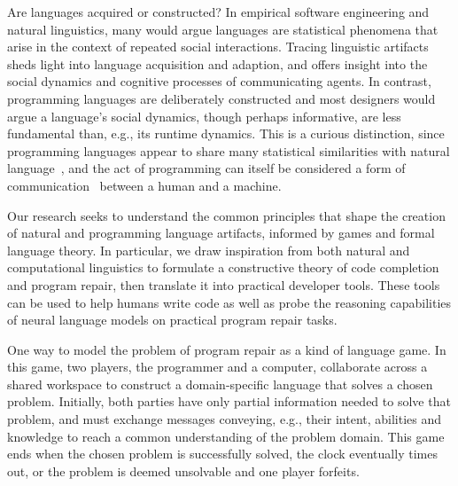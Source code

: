 \documentclass[sigplan,screen]{acmart}
\begin{document}

Are languages acquired or constructed? In empirical software engineering and natural linguistics, many would argue languages are statistical phenomena that arise in the context of repeated social interactions. Tracing linguistic artifacts sheds light into language acquisition and adaption, and offers insight into the social dynamics and cognitive processes of communicating agents. In contrast, programming languages are deliberately constructed and most designers would argue a language's social dynamics, though perhaps informative, are less fundamental than, e.g., its runtime dynamics. This is a curious distinction, since programming languages appear to share many statistical similarities with natural language~\cite{hindle2016naturalness}, and the act of programming can itself be considered a form of communication~\cite{demillo1979social} between a human and a machine.

Our research seeks to understand the common principles that shape the creation of natural and programming language artifacts, informed by games and formal language theory. In particular, we draw inspiration from both natural and computational linguistics to formulate a constructive theory of code completion and program repair, then translate it into practical developer tools. These tools can be used to help humans write code as well as probe the reasoning capabilities of neural language models on practical program repair tasks.

One way to model the problem of program repair as a kind of language game. In this game, two players, the programmer and a computer, collaborate across a shared workspace to construct a domain-specific language that solves a chosen problem. Initially, both parties have only partial information needed to solve that problem, and must exchange messages conveying, e.g., their intent, abilities and knowledge to reach a common understanding of the problem domain. This game ends when the chosen problem is successfully solved, the clock eventually times out, or the problem is deemed unsolvable and one player forfeits.
\end{document}
